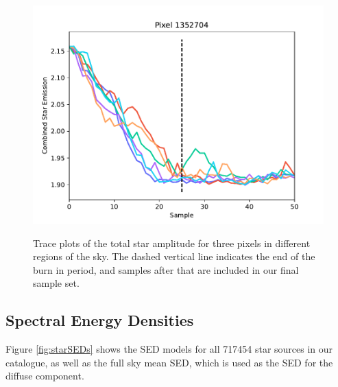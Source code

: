\documentclass{aa}
\begin{document}
\begin{figure}
  \includegraphics[width=\columnwidth]{figs/mixing/total_star_trace_1352704.pdf} \\
  \caption{Trace plots of the total star amplitude for three pixels in different regions of the sky. The dashed vertical line indicates the end of the burn in period, and samples after that are included in our final sample set.}
  \label{fig:amptrace}
\end{figure}


\subsection{Spectral Energy Densities}

Figure \ref{fig:starSEDs} shows the SED models for all 717454 star sources in our catalogue, as well as the full sky mean SED, which is used as the SED for the diffuse component. 
\end{document}
